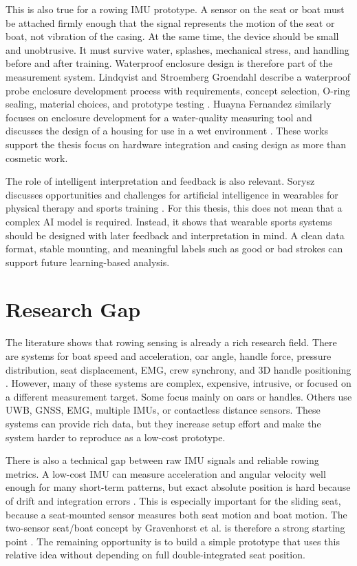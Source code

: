 This is also true for a rowing IMU prototype. A sensor on the seat or boat must be attached firmly enough that the signal represents the motion of the seat or boat, not vibration of the casing. At the same time, the device should be small and unobtrusive. It must survive water, splashes, mechanical stress, and handling before and after training. Waterproof enclosure design is therefore part of the measurement system. Lindqvist and Stroemberg Groendahl describe a waterproof probe enclosure development process with requirements, concept selection, O-ring sealing, material choices, and prototype testing \cite{lindqvist_design_2015}. Huayna Fernandez similarly focuses on enclosure development for a water-quality measuring tool and discusses the design of a housing for use in a wet environment \cite{huayna_fernandez_enclosure_2025}. These works support the thesis focus on hardware integration and casing design as more than cosmetic work.

The role of intelligent interpretation and feedback is also relevant. Sorysz discusses opportunities and challenges for artificial intelligence in wearables for physical therapy and sports training \cite{sorysz_artificial_2024}. For this thesis, this does not mean that a complex AI model is required. Instead, it shows that wearable sports systems should be designed with later feedback and interpretation in mind. A clean data format, stable mounting, and meaningful labels such as good or bad strokes can support future learning-based analysis.

\section{Research Gap}

The literature shows that rowing sensing is already a rich research field. There are systems for boat speed and acceleration, oar angle, handle force, pressure distribution, seat displacement, EMG, crew synchrony, and 3D handle positioning \cite{llosa_remote_2009,avvenuti_mars_2013,cloud_adaptive_2019,hohmuth_wireless_2023,rodriguez_mendoza_wearable_2024}. However, many of these systems are complex, expensive, intrusive, or focused on a different measurement target. Some focus mainly on oars or handles. Others use UWB, GNSS, EMG, multiple IMUs, or contactless distance sensors. These systems can provide rich data, but they increase setup effort and make the system harder to reproduce as a low-cost prototype.

There is also a technical gap between raw IMU signals and reliable rowing metrics. A low-cost IMU can measure acceleration and angular velocity well enough for many short-term patterns, but exact absolute position is hard because of drift and integration errors \cite{cloud_adaptive_2019,rodriguez_mendoza_wearable_2024}. This is especially important for the sliding seat, because a seat-mounted sensor measures both seat motion and boat motion. The two-sensor seat/boat concept by Gravenhorst et al. is therefore a strong starting point \cite{gravenhorst_self-aligning_2012}. The remaining opportunity is to build a simple prototype that uses this relative idea without depending on full double-integrated seat position.


